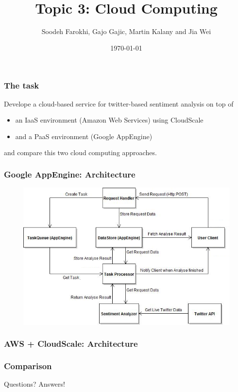 \documentclass{beamer}
\title{Topic 3: Cloud Computing}
\author{Soodeh Farokhi, Gajo Gajic, Martin Kalany and Jia Wei}
\date{\today}
\newcommand\fG[1]{\textcolor{green!80!black}{#1}}
\newcommand\fR[1]{\textcolor{red!80!black}{#1}}
\begin{document}
\frame{\titlepage}

\begin{frame}
\frametitle{The task}

Develope a cloud-based service for twitter-based sentiment analysis on top of
\begin{itemize}
\item an IaaS environment (Amazon Web Services) using CloudScale
\item and a PaaS environment (Google AppEngine)
\end{itemize}

and compare this two cloud computing approaches.

\end{frame}


\begin{frame}
\frametitle{Google AppEngine: Architecture}
\begin{figure}
 \centerline{\includegraphics[width=1\columnwidth]{AppEngine.png}}
  \label{fig:appengine}
\end{figure}
\end{frame}
  
\begin{frame}
\frametitle{AWS + CloudScale: Architecture}
\end{frame}

\begin{frame}
\frametitle{Comparison}
\end{frame}

\begin{frame}
\fR{Questions?} \fG{Answers!}
\end{frame}
\end{document}
